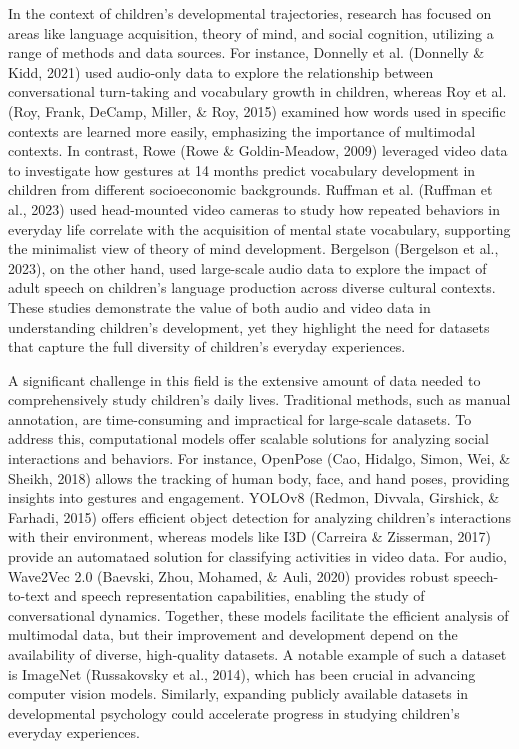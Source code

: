 \documentclass[
  man,floatsintext]{apa6}
\begin{document}
In the context of children's developmental trajectories, research has focused on areas like language acquisition, theory of mind, and social cognition, utilizing a range of methods and data sources. For instance, Donnelly et al. (Donnelly \& Kidd, 2021) used audio-only data to explore the relationship between conversational turn-taking and vocabulary growth in children, whereas Roy et al. (Roy, Frank, DeCamp, Miller, \& Roy, 2015) examined how words used in specific contexts are learned more easily, emphasizing the importance of multimodal contexts. In contrast, Rowe (Rowe \& Goldin-Meadow, 2009) leveraged video data to investigate how gestures at 14 months predict vocabulary development in children from different socioeconomic backgrounds. Ruffman et al. (Ruffman et al., 2023) used head-mounted video cameras to study how repeated behaviors in everyday life correlate with the acquisition of mental state vocabulary, supporting the minimalist view of theory of mind development. Bergelson (Bergelson et al., 2023), on the other hand, used large-scale audio data to explore the impact of adult speech on children's language production across diverse cultural contexts. These studies demonstrate the value of both audio and video data in understanding children's development, yet they highlight the need for datasets that capture the full diversity of children's everyday experiences.

A significant challenge in this field is the extensive amount of data needed to comprehensively study children's daily lives. Traditional methods, such as manual annotation, are time-consuming and impractical for large-scale datasets. To address this, computational models offer scalable solutions for analyzing social interactions and behaviors. For instance, OpenPose (Cao, Hidalgo, Simon, Wei, \& Sheikh, 2018) allows the tracking of human body, face, and hand poses, providing insights into gestures and engagement. YOLOv8 (Redmon, Divvala, Girshick, \& Farhadi, 2015) offers efficient object detection for analyzing children's interactions with their environment, whereas models like I3D (Carreira \& Zisserman, 2017) provide an automataed solution for classifying activities in video data. For audio, Wave2Vec 2.0 (Baevski, Zhou, Mohamed, \& Auli, 2020) provides robust speech-to-text and speech representation capabilities, enabling the study of conversational dynamics. Together, these models facilitate the efficient analysis of multimodal data, but their improvement and development depend on the availability of diverse, high-quality datasets. A notable example of such a dataset is ImageNet (Russakovsky et al., 2014), which has been crucial in advancing computer vision models. Similarly, expanding publicly available datasets in developmental psychology could accelerate progress in studying children's everyday experiences.
\end{document}
